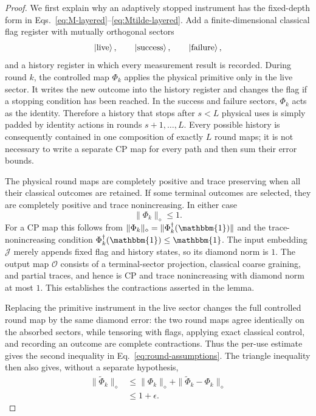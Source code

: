 \documentclass[aps,floatfix,10pt,amssymb,amsmath,superscriptaddress,nofootinbib,longbibliography,nobalancelastpage,twocolumn]{revtex4-2}
\newcommand{\id}{\mathbbm{1}}
\begin{document}
\begin{proof}
We first explain why an adaptively stopped instrument has the fixed-depth form in Eqs.~\eqref{eq:M-layered}--\eqref{eq:Mtilde-layered}.  Add a finite-dimensional classical flag register with mutually orthogonal sectors
\begin{equation}
 \ket{\mathrm{live}},\qquad
 \ket{\mathrm{success}},\qquad
 \ket{\mathrm{failure}},
 \label{eq:stopping-flags}
\end{equation}
and a history register in which every measurement result is recorded.  During round $k$, the controlled map $\Phi_k$ applies the physical primitive only in the live sector.  It writes the new outcome into the history register and changes the flag if a stopping condition has been reached.  In the success and failure sectors, $\Phi_k$ acts as the identity.  Therefore a history that stops after $s<L$ physical uses is simply padded by identity actions in rounds $s+1,\ldots,L$.  Every possible history is consequently contained in one composition of exactly $L$ round maps; it is not necessary to write a separate CP map for every path and then sum their error bounds.

The physical round maps are completely positive and trace preserving when all their classical outcomes are retained.  If some terminal outcomes are selected, they are completely positive and trace nonincreasing.  In either case
\begin{equation}
 \|\Phi_k\|_\diamond\leq1.
 \label{eq:physical-round-contraction}
\end{equation}
For a CP map this follows from
$\|\Phi_k\|_\diamond=\|\Phi_k^\dagger(\id)\|$ and the trace-nonincreasing condition
$\Phi_k^\dagger(\id)\leq\id$.  The input embedding $\mathcal J$ merely appends fixed flag and history states, so its diamond norm is $1$.  The output map $\mathcal O$ consists of a terminal-sector projection, classical coarse graining, and partial traces, and hence is CP and trace nonincreasing with diamond norm at most $1$.  This establishes the contractions asserted in the lemma.

Replacing the primitive instrument in the live sector changes the full controlled round map by the same diamond error: the two round maps agree identically on the absorbed sectors, while tensoring with flags, applying exact classical control, and recording an outcome are complete contractions.  Thus the per-use estimate gives the second inequality in Eq.~\eqref{eq:round-assumptions}.  The triangle inequality then also gives, without a separate hypothesis,
\begin{align}
 \|\widetilde\Phi_k\|_\diamond
 &\leq\|\Phi_k\|_\diamond
 +\|\widetilde\Phi_k-\Phi_k\|_\diamond\nonumber\\
 &\leq1+\epsilon.
 \label{eq:aux-round-norm}
\end{align}


\end{proof}
\end{document}
